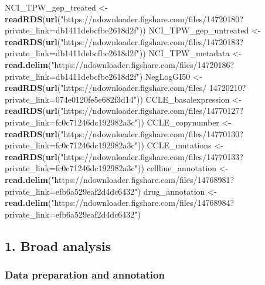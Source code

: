 \documentclass[]{article}
\newenvironment{Shaded}{\begin{snugshade}}{\end{snugshade}}
\newcommand{\KeywordTok}[1]{\textcolor[rgb]{0.13,0.29,0.53}{\textbf{#1}}}
\newcommand{\NormalTok}[1]{#1}
\newcommand{\StringTok}[1]{\textcolor[rgb]{0.31,0.60,0.02}{#1}}
\begin{document}
\begin{Shaded}
\begin{Highlighting}[]
\NormalTok{NCI_TPW_gep_treated <-}\StringTok{ }\KeywordTok{readRDS}\NormalTok{(}\KeywordTok{url}\NormalTok{(}\StringTok{"https://ndownloader.figshare.com/files/14720180?private_link=db1411debcfbe2618d2f"}\NormalTok{))}
\NormalTok{NCI_TPW_gep_untreated <-}\StringTok{ }\KeywordTok{readRDS}\NormalTok{(}\KeywordTok{url}\NormalTok{(}\StringTok{"https://ndownloader.figshare.com/files/14720183?private_link=db1411debcfbe2618d2f"}\NormalTok{))}
\NormalTok{NCI_TPW_metadata <-}\StringTok{ }\KeywordTok{read.delim}\NormalTok{(}\StringTok{"https://ndownloader.figshare.com/files/14720186?private_link=db1411debcfbe2618d2f"}\NormalTok{)}
\NormalTok{NegLogGI50 <-}\StringTok{ }\KeywordTok{readRDS}\NormalTok{(}\KeywordTok{url}\NormalTok{(}\StringTok{"https://ndownloader.figshare.com/files/ 14720210?private_link=074e0120fe5e682f3d14"}\NormalTok{))}
\NormalTok{CCLE_basalexpression <-}\StringTok{ }\KeywordTok{readRDS}\NormalTok{(}\KeywordTok{url}\NormalTok{(}\StringTok{"https://ndownloader.figshare.com/files/14770127?private_link=fc0c71246dc192982a3c"}\NormalTok{))}
\NormalTok{CCLE_copynumber <-}\StringTok{ }\KeywordTok{readRDS}\NormalTok{(}\KeywordTok{url}\NormalTok{(}\StringTok{"https://ndownloader.figshare.com/files/14770130?private_link=fc0c71246dc192982a3c"}\NormalTok{))}
\NormalTok{CCLE_mutations <-}\StringTok{ }\KeywordTok{readRDS}\NormalTok{(}\KeywordTok{url}\NormalTok{(}\StringTok{"https://ndownloader.figshare.com/files/14770133?private_link=fc0c71246dc192982a3c"}\NormalTok{))}
\NormalTok{cellline_annotation <-}\KeywordTok{read.delim}\NormalTok{(}\StringTok{"https://ndownloader.figshare.com/files/14768981?private_link=efb6a529eaf2d4dc6432"}\NormalTok{)}
\NormalTok{drug_annotation <-}\StringTok{ }\KeywordTok{read.delim}\NormalTok{(}\StringTok{"https://ndownloader.figshare.com/files/14768984?private_link=efb6a529eaf2d4dc6432"}\NormalTok{)}
\end{Highlighting}
\end{Shaded}

\hypertarget{broad-analysis}{%
\subsection{1. Broad analysis}\label{broad-analysis}}

\hypertarget{data-preparation-and-annotation}{%
\subsubsection{Data preparation and
annotation}\label{data-preparation-and-annotation}}
\end{document}
